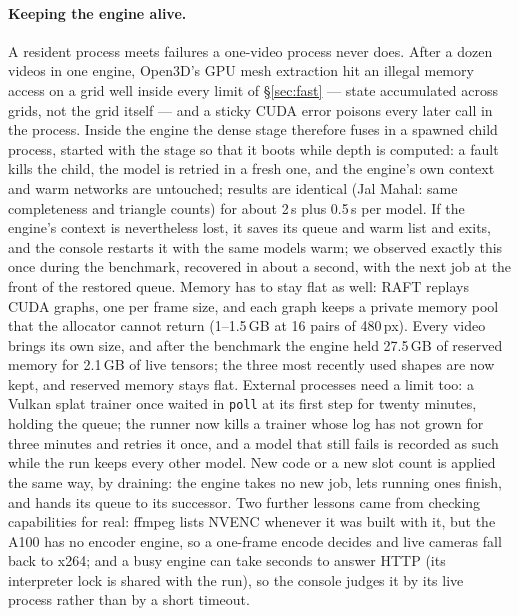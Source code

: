 \documentclass[10pt,a4paper,twocolumn]{article}
\begin{document}
\paragraph{Keeping the engine alive.} A resident process meets failures a one-video process never does. After a dozen videos in one engine, Open3D's GPU mesh extraction hit an illegal memory access on a grid well inside every limit of \S\ref{sec:fast} --- state accumulated across grids, not the grid itself --- and a sticky CUDA error poisons every later call in the process. Inside the engine the dense stage therefore fuses in a spawned child process, started with the stage so that it boots while depth is computed: a fault kills the child, the model is retried in a fresh one, and the engine's own context and warm networks are untouched; results are identical (Jal Mahal: same completeness and triangle counts) for about 2\,s plus 0.5\,s per model. If the engine's context is nevertheless lost, it saves its queue and warm list and exits, and the console restarts it with the same models warm; we observed exactly this once during the benchmark, recovered in about a second, with the next job at the front of the restored queue. Memory has to stay flat as well: RAFT replays CUDA graphs, one per frame size, and each graph keeps a private memory pool that the allocator cannot return (1--1.5\,GB at 16 pairs of 480\,px). Every video brings its own size, and after the benchmark the engine held 27.5\,GB of reserved memory for 2.1\,GB of live tensors; the three most recently used shapes are now kept, and reserved memory stays flat. External processes need a limit too: a Vulkan splat trainer once waited in \texttt{poll} at its first step for twenty minutes, holding the queue; the runner now kills a trainer whose log has not grown for three minutes and retries it once, and a model that still fails is recorded as such while the run keeps every other model. New code or a new slot count is applied the same way, by draining: the engine takes no new job, lets running ones finish, and hands its queue to its successor. Two further lessons came from checking capabilities for real: ffmpeg lists NVENC whenever it was built with it, but the A100 has no encoder engine, so a one-frame encode decides and live cameras fall back to x264; and a busy engine can take seconds to answer HTTP (its interpreter lock is shared with the run), so the console judges it by its live process rather than by a short timeout.
\end{document}
